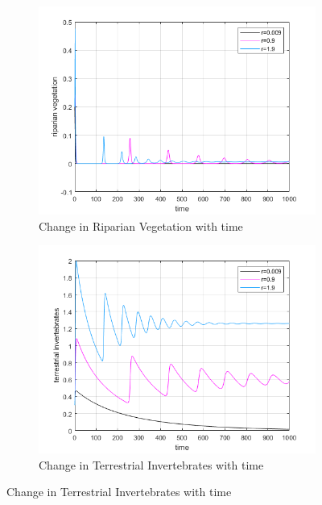 \documentclass[12pt]{article}
\numberwithin{equation}{section}
\begin{document}
\begin{figure}[bp!]
	\centering
	\begin{subfigure}[t]{0.45\textwidth}
		\centering
	\includegraphics[width=\textwidth]{time_vs_riparian_r.png}
		\caption{Change in Riparian Vegetation with time} \label{fig:time_vs_riparian_r}
	\end{subfigure}
\hspace{0.08\textwidth}
        \begin{subfigure}[t]{0.45\textwidth}
                 \centering
         \includegraphics[width=\textwidth]{time_vs_invertebrates_r.png}
		\caption{Change in Terrestrial Invertebrates with time} \label{fig:time_vs_invertebrates_r}
	\end{subfigure}

\end{figure}
\end{document}
